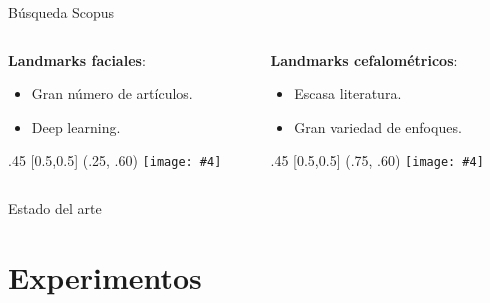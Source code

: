 \documentclass[aspectratio=43]{beamer}
\renewcommand{\cite}[1]{\footnote<.->[frame]{\fullcite{#1}}}
\newcommand{\absimage}[4][0.5,0.5]{%
	\begin{textblock}{#3}%
		[#1]%
		(#2)%
		\texttt{[image: \#4]}%
\end{textblock}}
\begin{document}
\begin{frame}[t]{Búsqueda Scopus}

  \begin{columns}[onlytextwidth]
    \begin{column}{.5\textwidth}
      \textbf{Landmarks faciales}:
      \begin{itemize}
        \item Gran número de artículos.
        \item Deep learning.
      \end{itemize}
      \absimage{.25, .60}{.45}{imgs/Scopus_1.png}
    \end{column}
    \begin{column}{.5\textwidth}
      \textbf{Landmarks cefalométricos}:
      \begin{itemize}
        \item Escasa literatura. \item Gran variedad de enfoques.
      \end{itemize}
      \absimage{.75, .60}{.45}{imgs/Scopus_2.png}
    \end{column}
  \end{columns}
\end{frame}

\begin{frame}[t]{Estado del arte}

\end{frame}


\section{Experimentos}
\end{document}
